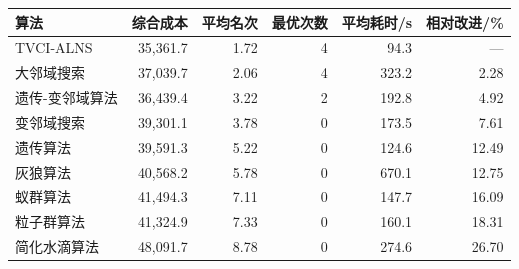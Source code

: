 \begin{tabular}{lrrrrr}
\toprule
算法 & 综合成本 & 平均名次 & 最优次数 & 平均耗时/s & 相对改进/\% \\
\midrule
TVCI-ALNS & 35,361.7 & 1.72 & 4 & 94.3 & --- \\
大邻域搜索 & 37,039.7 & 2.06 & 4 & 323.2 & 2.28 \\
遗传-变邻域算法 & 36,439.4 & 3.22 & 2 & 192.8 & 4.92 \\
变邻域搜索 & 39,301.1 & 3.78 & 0 & 173.5 & 7.61 \\
遗传算法 & 39,591.3 & 5.22 & 0 & 124.6 & 12.49 \\
灰狼算法 & 40,568.2 & 5.78 & 0 & 670.1 & 12.75 \\
蚁群算法 & 41,494.3 & 7.11 & 0 & 147.7 & 16.09 \\
粒子群算法 & 41,324.9 & 7.33 & 0 & 160.1 & 18.31 \\
简化水滴算法 & 48,091.7 & 8.78 & 0 & 274.6 & 26.70 \\
\bottomrule
\end{tabular}
